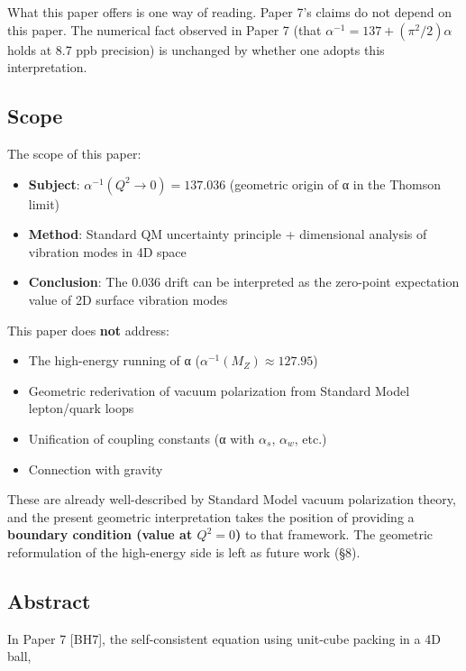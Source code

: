 \documentclass[
  11pt]{article}
\providecommand{\tightlist}{%
  \setlength{\itemsep}{0pt}\setlength{\parskip}{0pt}}
\begin{document}
What this paper offers is one way of reading. Paper 7's claims do not
depend on this paper. The numerical fact observed in Paper 7 (that
\(\alpha^{-1} = 137 + (\pi^2/2)\alpha\) holds at 8.7 ppb precision) is
unchanged by whether one adopts this interpretation.

\subsection{Scope}\label{scope}

The scope of this paper:

\begin{itemize}
\tightlist
\item
  \textbf{Subject}: \(\alpha^{-1}(Q^2 \to 0) = 137.036\) (geometric
  origin of α in the Thomson limit)
\item
  \textbf{Method}: Standard QM uncertainty principle + dimensional
  analysis of vibration modes in 4D space
\item
  \textbf{Conclusion}: The 0.036 drift can be interpreted as the
  zero-point expectation value of 2D surface vibration modes
\end{itemize}

This paper does \textbf{not} address:

\begin{itemize}
\tightlist
\item
  The high-energy running of α (\(\alpha^{-1}(M_Z) \approx 127.95\))
\item
  Geometric rederivation of vacuum polarization from Standard Model
  lepton/quark loops
\item
  Unification of coupling constants (α with \(\alpha_s\), \(\alpha_w\),
  etc.)
\item
  Connection with gravity
\end{itemize}

These are already well-described by Standard Model vacuum polarization
theory, and the present geometric interpretation takes the position of
providing a \textbf{boundary condition (value at \(Q^2 = 0\))} to that
framework. The geometric reformulation of the high-energy side is left
as future work (§8).

\subsection{Abstract}\label{abstract}

In Paper 7 {[}BH7{]}, the self-consistent equation using unit-cube
packing in a 4D ball,
\end{document}
